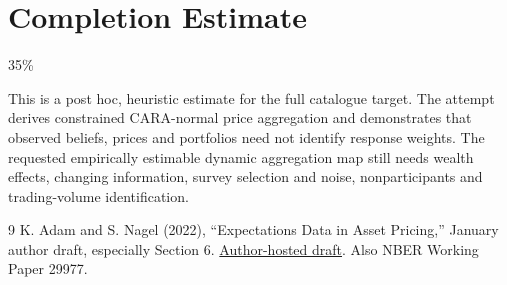 \documentclass[11pt]{article}
\theoremstyle{definition}
\begin{document}
\section{Completion Estimate}
35\%

This is a post hoc, heuristic estimate for the full catalogue target.
The attempt derives constrained CARA-normal price aggregation and demonstrates that observed beliefs, prices and portfolios need not identify response weights. The requested empirically estimable dynamic aggregation map still needs wealth effects, changing information, survey selection and noise, nonparticipants and trading-volume identification.

\begin{thebibliography}{9}
 K. Adam and S. Nagel (2022), ``Expectations Data in Asset Pricing,'' January author draft, especially Section 6. \href{https://bpb-us-w2.wpmucdn.com/voices.uchicago.edu/dist/f/575/files/2022/01/ExpectationsSurvey_13.pdf}{Author-hosted draft}. Also NBER Working Paper 29977.
\end{thebibliography}
\end{document}
